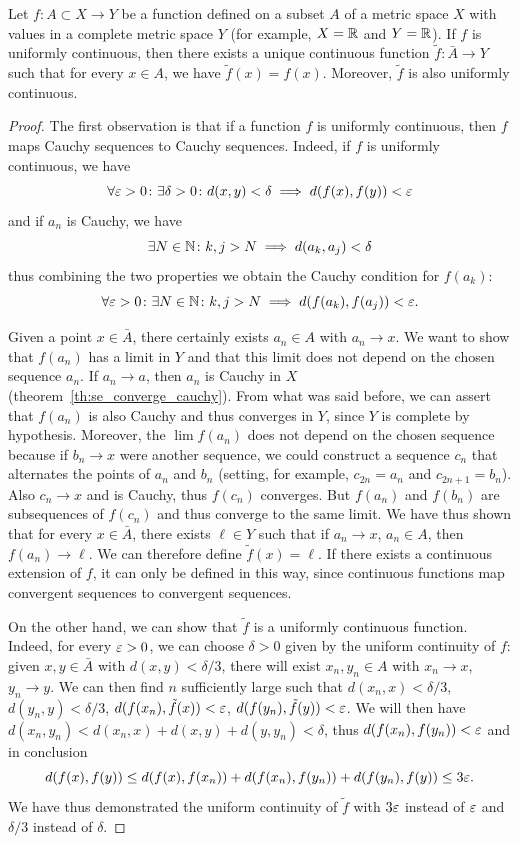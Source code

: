 \begin{theorem}
\mymark{**}%
\label{th:estensione_uniformemente_continua}%
Let $f\colon A \subset X \to Y$ be a function defined on a subset $A$
of a metric space $X$ with values in a complete metric space $Y$
(for example, $X={\mathbb R}$ and $Y={\mathbb R}$). If $f$ is uniformly continuous, then
there exists a unique continuous function $\tilde f \colon \bar A \to Y$
such that for every $x\in A$, we have $\tilde f(x) = f(x)$.
Moreover, $\tilde f$ is also uniformly continuous.
\end{theorem}
%
\begin{proof}
The first observation is
that if a function $f$ is uniformly continuous, then $f$
maps Cauchy sequences to Cauchy sequences.
Indeed, if $f$ is uniformly continuous, we have
\[
 \forall \varepsilon>0\colon \exists \delta>0 \colon d(x,y)<\delta \implies d(f(x),f(y))<\varepsilon
\]
and if $a_n$ is Cauchy, we have
\[
 \exists N\in{\mathbb N} \colon k,j>N \implies d(a_k,a_j)< \delta
\]
thus combining the two properties
we obtain the Cauchy condition for $f(a_k)$:
\[
\forall \varepsilon>0\colon \exists N\in {\mathbb N}\colon k,j>N \implies d(f(a_k),f(a_j))< \varepsilon.
\]

Given a point $x \in \bar A$, there certainly exists $a_n \in A$ with $a_n\to
x$.
We want to show that $f(a_n)$ has a limit in $Y$ and that this limit does not
depend on the chosen sequence $a_n$. If $a_n \to a$, then $a_n$ is Cauchy in $X$
(theorem~\ref{th:se_converge_cauchy}).
From what was said before, we can assert that $f(a_n)$ is also Cauchy
and thus converges in $Y$, since $Y$ is complete by hypothesis.
Moreover, the $\lim f(a_n)$ does not depend on the chosen sequence because
if $b_n\to x$ were another sequence, we could construct a sequence
$c_n$ that alternates the points of $a_n$ and $b_n$ (setting, for example,
$c_{2n} = a_n$ and
$c_{2n+1} = b_n$). Also $c_n \to x$ and is Cauchy, thus $f(c_n)$ converges.
But $f(a_n)$ and $f(b_n)$ are subsequences of $f(c_n)$ and thus converge
to the same limit.
We have thus shown that for every $x\in \bar A$, there exists $\ell \in Y$
such that if $a_n\to x$, $a_n\in A$, then $f(a_n) \to \ell$. We can
therefore define $\tilde f(x)=\ell$. If there exists a continuous extension of
$f$, it can only be defined in this way, since continuous functions
map convergent sequences to convergent sequences.

On the other hand, we can show that $\tilde f$ is a uniformly continuous
function.
Indeed, for every $\varepsilon>0$, we can choose $\delta>0$ given by the uniform
continuity of $f$: given $x,y\in \bar A$ with $d(x,y)<\delta/3$, there will
exist
$x_n,y_n \in A$ with $x_n\to x$, $y_n\to y$. We can then find $n$
sufficiently large such that
$d(x_n,x)<\delta/3$, $d(y_n,y)<\delta/3$,
$d(f(x_n),\tilde f(x)) < \varepsilon$, $d(f(y_n),\tilde f(y)) < \varepsilon$.
We will then have
$d(x_n,y_n)< d(x_n,x)+d(x,y)+d(y,y_n) < \delta$, thus $d(f(x_n),f(y_n))<\varepsilon$
and in conclusion
\[
d(f(x),f(y))
\le d(f(x),f(x_n)) + d(f(x_n),f(y_n)) + d(f(y_n),f(y))
\le 3\varepsilon.
\]
We have thus demonstrated the uniform continuity of $\tilde f$ with $3\varepsilon$
instead of
$\varepsilon$ and $\delta/3$
instead of $\delta$.
\end{proof}

